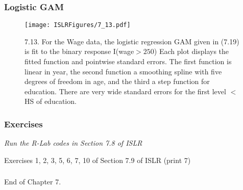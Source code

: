 \documentclass{beamer}
\begin{document}
                                 \begin{frame}
                                 	\frametitle{Logistic GAM}
                                 	\begin{figure}
                                 		\centering
                                 		
                                 		\centering
                                 		\texttt{[image: ISLRFigures/7\_13.pdf]}
                                 		\caption{7.13. For the Wage data, the logistic regression GAM given in (7.19)
                                 			is fit to the binary response I(wage$>250$)
                                 		Each plot displays the fitted function
                                 			and pointwise standard errors. The first function is linear in year, the second
                                 			function a smoothing spline with five degrees of freedom in age, and the third a
                                 			step function for education. There are very wide standard errors for the first
                                 			level $<$HS of education.
                                 		}
                                 	\end{figure}
                                 \end{frame}
                                  
                 
                 
                         
                                
                      
      		\begin{frame}
      			\frametitle{Exercises  }
      			
      			
      			{\sl  Run the R-Lab codes in Section 7.8 of ISLR
      				
      				Exercises 1, 2, 3, 5, 6, 7, 10 of Section 7.9 of ISLR (print 7) %
      			}
      			
      			
      			
      			
      			
      		\end{frame}
      		
      			\begin{frame}
      				\frametitle{  }
      				
      				
      				
      				End of Chapter 7. 
      				
      				
      			\end{frame}
      
    
\end{document}
